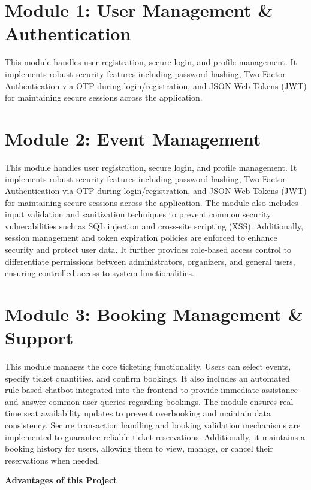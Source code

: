 \documentclass[12pt]{report}
\begin{document}
\section{Module 1: User Management \& Authentication}  

This module handles user registration, secure login, and profile management. It implements robust security features including password hashing, Two-Factor Authentication via OTP during login/registration, and JSON Web Tokens (JWT) for maintaining secure sessions across the application.

\section{Module 2: Event Management}  

This module handles user registration, secure login, and profile management. It implements robust security features including password hashing, Two-Factor Authentication via OTP during login/registration, and JSON Web Tokens (JWT) for maintaining secure sessions across the application. The module also includes input validation and sanitization techniques to prevent common security vulnerabilities such as SQL injection and cross-site scripting (XSS). Additionally, session management and token expiration policies are enforced to enhance security and protect user data. It further provides role-based access control to differentiate permissions between administrators, organizers, and general users, ensuring controlled access to system functionalities.


\section{Module 3: Booking Management \& Support}  

This module manages the core ticketing functionality. Users can select events, specify ticket quantities, and confirm bookings. It also includes an automated rule-based chatbot integrated into the frontend to provide immediate assistance and answer common user queries regarding bookings. The module ensures real-time seat availability updates to prevent overbooking and maintain data consistency. Secure transaction handling and booking validation mechanisms are implemented to guarantee reliable ticket reservations. Additionally, it maintains a booking history for users, allowing them to view, manage, or cancel their reservations when needed.


\textbf{Advantages of this Project}
\end{document}
